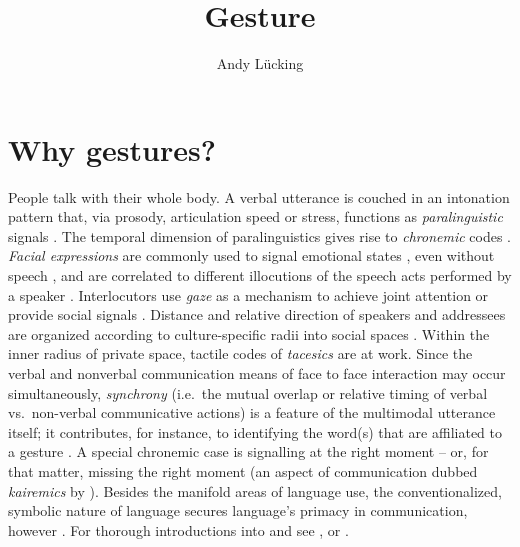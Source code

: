 \documentclass[output=paper,biblatex,babelshorthands,newtxmath,draftmode,colorlinks,citecolor=brown]{langscibook}
\author{Andy Lücking\orcid{0000-0002-5070-2233}\affiliation{Universit\'{e} de Paris, Goethe-Universität Frankfurt}}
\title{Gesture}
\begin{document}
\maketitle
\label{chap-gesture}


\section{Why gestures?} 
\label{sec:why-gestures}

People talk with their whole body. 
%
A verbal utterance is couched in an intonation pattern that, via prosody, articulation speed or stress, functions as \emph{paralinguistic} signals \citep[e.g.][]{Birdwhistell:1970}. 
%
The temporal dimension of paralinguistics gives rise to \emph{chronemic} codes \citep{Poyatos:1975,Bruneau:1980}. \emph{Facial expressions} are commonly used to signal emotional states \citep{Ekman:Friesen:1978}, even without speech \citep{Argyle:1975}, and are correlated to different illocutions of the speech acts performed by a speaker \citep{Domaneschi:Passarelli:Chiorri:2017}.
%
Interlocutors use \emph{gaze} as a mechanism to achieve joint attention \citep{Argyle:Cook:1976} or provide social signals \citep{Kendon:1967}. 
%
Distance and relative direction of speakers and addressees are organized according to culture-specific radii into social spaces \citep[\emph{proxemics},][]{Hall:1968}. 
%
Within the inner radius of private space, tactile codes of \emph{tacesics} \citep{Kauffman:1971} are at work. 
%
Since the verbal and nonverbal communication means of face to face interaction may occur simultaneously, \emph{synchrony} (i.e.\ the mutual overlap or relative timing of verbal vs.\ non-verbal communicative actions) is a feature of the multimodal utterance itself; it contributes, for instance, to identifying the word(s) that are affiliated to a gesture \citep{Wiltshire:2007}. 
%
A special chronemic case is signalling at the right moment -- or, for that matter, missing the right moment (an aspect of communication dubbed \emph{kairemics} by \citealp[]{Luecking:Pfeiffer:2012}).
%
Besides the manifold areas of language use, the conventionalized, symbolic nature of language secures language's primacy in communication, however \citep{de:Ruiter:2004}.
%
For thorough introductions into  and  see \citet{Noeth:1990}, \citet{Posner:Robering:Sebeok:1997:2004} or \citet{Mueller:Cienki:Fricke:Ladewig:McNeill:Tessendorf:2013,Mueller:Cienki:Fricke:Ladewig:McNeill:Bressem:2014}.
\end{document}
